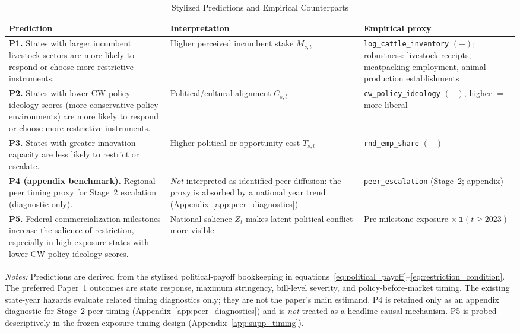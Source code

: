 \documentclass[12pt]{article}
\begin{document}
\begin{table}[htbp]
\centering
\begin{threeparttable}
\caption{Stylized Predictions and Empirical Counterparts}
\label{tab:predictions}
\small
\begin{tabular}{p{}p{}p{}}
\toprule
Prediction & Interpretation & Empirical proxy \\
\midrule
\textbf{P1.} States with larger incumbent livestock sectors are more likely to respond or choose more restrictive instruments.
  & Higher perceived incumbent stake $M_{s,t}$
  & \texttt{log\_cattle\_inventory} $(+)$; robustness: livestock receipts, meatpacking employment, animal-production establishments \\
\addlinespace
\textbf{P2.} States with lower CW policy ideology scores (more conservative policy environments) are more likely to respond or choose more restrictive instruments.
  & Political/cultural alignment $C_{s,t}$
  & \texttt{cw\_policy\_ideology} $(-)$, higher $=$ more liberal \\
\addlinespace
\textbf{P3.} States with greater innovation capacity are less likely to restrict or escalate.
  & Higher political or opportunity cost $T_{s,t}$
  & \texttt{rnd\_emp\_share} $(-)$ \\
\addlinespace
\textbf{P4 (appendix benchmark).} Regional peer timing proxy for Stage~2 escalation (diagnostic only).
  & \emph{Not} interpreted as identified peer diffusion: the proxy is absorbed by a national year trend (Appendix~\ref{app:peer_diagnostics})
  & \texttt{peer\_escalation} (Stage~2; appendix) \\
\addlinespace
\textbf{P5.} Federal commercialization milestones increase the salience of restriction, especially in high-exposure states with lower CW policy ideology scores.
  & National salience $Z_t$ makes latent political conflict more visible
  & Pre-milestone exposure $\times\, \mathbf{1}(t \geq 2023)$ \\
\bottomrule
\end{tabular}
\begin{tablenotes}[flushleft]
\footnotesize
\item \textit{Notes:} Predictions are derived from the stylized political-payoff bookkeeping in equations~\eqref{eq:political_payoff}--\eqref{eq:restriction_condition}.  The preferred Paper~1 outcomes are state response, maximum stringency, bill-level severity, and policy-before-market timing.  The existing state-year hazards evaluate related timing diagnostics only; they are not the paper's main estimand.  P4 is retained only as an appendix diagnostic for Stage~2 peer timing (Appendix~\ref{app:peer_diagnostics}) and is \emph{not} treated as a headline causal mechanism.  P5 is probed descriptively in the frozen-exposure timing design (Appendix~\ref{app:supp_timing}).
\end{tablenotes}
\end{threeparttable}
\end{table}
\end{document}

